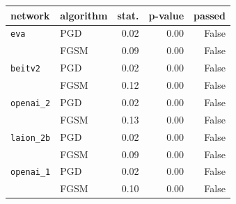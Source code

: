 \begin{tabular}{llrrr}
\toprule
network & algorithm & stat. & p-value & passed \\
\midrule
\texttt{eva} & PGD & 0.02 & 0.00 & False \\
 & FGSM & 0.09 & 0.00 & False \\
\texttt{beitv2} & PGD & 0.02 & 0.00 & False \\
 & FGSM & 0.12 & 0.00 & False \\
\texttt{openai\_2} & PGD & 0.02 & 0.00 & False \\
 & FGSM & 0.13 & 0.00 & False \\
\texttt{laion\_2b} & PGD & 0.02 & 0.00 & False \\
 & FGSM & 0.09 & 0.00 & False \\
\texttt{openai\_1} & PGD & 0.02 & 0.00 & False \\
 & FGSM & 0.10 & 0.00 & False \\
\bottomrule
\end{tabular}
